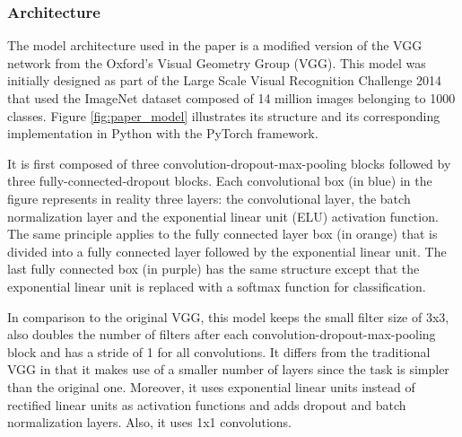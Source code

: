 \subsubsection{Architecture}
\setlength{\marginparwidth}{3cm}\leavevmode {}The model architecture used in the paper is a modified version of the VGG network from the Oxford's Visual Geometry Group (VGG). This model was initially designed as part of the Large Scale Visual Recognition Challenge 2014 that used the ImageNet dataset composed of 14 million images belonging to 1000 classes. Figure \ref{fig:paper_model} illustrates its structure and its corresponding implementation in Python with the PyTorch framework.

It is first composed of three convolution-dropout-max-pooling blocks followed by three fully-connected-dropout blocks. Each convolutional box (in blue) in the figure represents in reality three layers: the convolutional layer, the batch normalization layer and the exponential linear unit (ELU) activation function. The same principle applies to the fully connected layer box (in orange) that is divided into a fully connected layer followed by the exponential linear unit. The last fully connected box (in purple) has the same structure except that the exponential linear unit is replaced with a softmax function for classification.

In comparison to the original VGG, this model keeps the small filter size of 3x3, also doubles the number of filters after each convolution-dropout-max-pooling block and has a stride of 1 for all convolutions. It differs from the traditional VGG in that it makes use of a smaller number of layers since the task is simpler than the original one. Moreover, it uses exponential linear units instead of rectified linear units as activation functions and adds dropout and batch normalization layers. Also, it uses 1x1 convolutions. 

